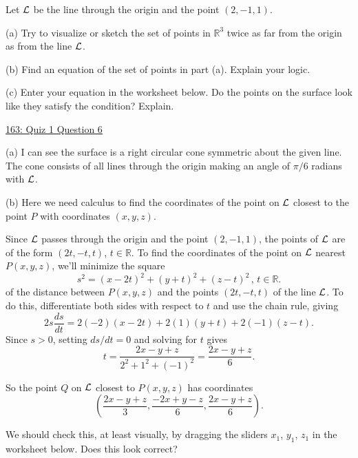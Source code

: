 \documentclass{ximera}
\begin{document}
\begin{question}  \label{Q43532432423432}
Let ${\cal L}$ be the line through the origin and the point $(2,-1,1)$.

(a) Try to visualize or sketch the set of points in $\mathbb{R}^3$  twice as far from the origin as from the line ${\cal L}$.

(b) Find an equation of the set of points in part (a). Explain your logic.

(c) Enter  your equation in the worksheet below. Do the points on the surface look like they satisfy the condition? Explain.

\begin{onlineOnly}
    \begin{center}
\end{center}
\end{onlineOnly}

\href{https://www.desmos.com/3d/wzv6plrbe6}{163: Quiz 1 Question 6}

\begin{explanation}
(a) I can see the surface is a right circular cone symmetric about the given line. The cone consists of all lines through the origin making an angle of $\pi/6$ radians with ${\cal L}$.

(b) Here we need calculus to find the coordinates of the point on ${\cal L}$ closest to the point $P$ with coordinates $(x,y,z)$.

Since ${\cal L}$ passes through the origin and the point $(2,-1,1)$, the points of ${\cal L}$ are of the form $(2t, -t, t)$, $t\in \mathbb{R}$. To find the coordinates of the point on ${\cal L}$ nearest $P(x,y,z)$, we'll minimize the square
\[
       s^2 = (x-2t)^2 +(y+t)^2 + (z-t)^2 \, , \, t\in \mathbb{R} .
\]
of the distance between $P(x,y,z)$ and the points $(2t, -t ,t )$ of the line ${\cal L}$. To do this, differentiate both sides with respect to $t$ and use the chain rule, giving
\[
        2s \frac{ds}{dt} = 2(-2)(x-2t) +2(1)(y+t)  + 2(-1)(z-t) .
\]
Since $s>0$, setting $ds/dt=0$ and solving for $t$ gives
\[
        t = \frac{2x - y + z}{2^2+1^2+(-1)^2} = \frac{2x-y+z}{6} .
\]

So the point $Q$ on ${\cal L}$ closest to $P(x,y,z)$ has coordinates
\[
   \left(  \frac{2x-y+z}{3} , \frac{-2x+y-z}{6}  , \frac{2x-y+z}{6}     \right) .
\]

We should check this, at least visually, by dragging the sliders $x_1$, $y_1$, $z_1$ in the worksheet below. Does this look correct?


\end{explanation}
\end{question}
\end{document}
